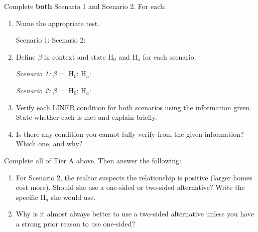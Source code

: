 \documentclass[10pt]{article}
\begin{document}
\begin{tcolorbox}[colback=white, colframe=black!40,
    title=\textbf{Tier A --- Approaching Proficiency},
    fonttitle=\bfseries, arc=2mm, left=3mm, right=3mm, top=2mm, bottom=2mm]

Complete \textbf{both} Scenario 1 and Scenario 2. For each:

\begin{enumerate}[label=\alph*.]

  \item Name the appropriate test.

        Scenario 1: \blank{6cm} \qquad Scenario 2: \blank{6cm}

  \item Define $\beta$ in context and state H$_0$ and H$_a$ for each scenario.

        \textit{Scenario 1:} $\beta = $ \writeline
        H$_0$: \blank{8cm} \quad H$_a$: \blank{8cm}

        \vspace{0.05in}
        \textit{Scenario 2:} $\beta = $ \writeline
        H$_0$: \blank{8cm} \quad H$_a$: \blank{8cm}

  \item Verify each LINER condition for both scenarios using the information given.
        State whether each is met and explain briefly.


  \item Is there any condition you cannot fully verify from the given information?
        Which one, and why?


\end{enumerate}
\end{tcolorbox}

\begin{tcolorbox}[colback=white, colframe=black!40,
    title=\textbf{Tier E --- Extension},
    fonttitle=\bfseries, arc=2mm, left=3mm, right=3mm, top=2mm, bottom=2mm]

Complete all of Tier A above. Then answer the following:

\begin{enumerate}[label=\alph*., start=5]

  \item For Scenario 2, the realtor suspects the relationship is positive (larger
        homes cost more). Should she use a one-sided or two-sided alternative?
        Write the specific H$_a$ she would use.


  \item Why is it almost always better to use a two-sided alternative unless you
        have a strong prior reason to use one-sided?


\end{enumerate}
\end{tcolorbox}
\end{document}
